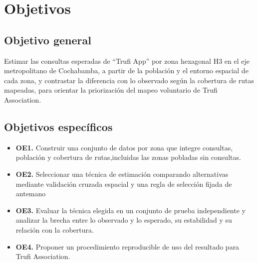 \chapter{Objetivos}
\label{cap:objetivos}

\section{Objetivo general}
\label{sec:objetivo-general}

Estimar las consultas esperadas de ``Trufi App'' por zona hexagonal H3 en el eje metropolitano de Cochabamba,
a partir de la población y el entorno espacial de cada zona, y contrastar la diferencia con lo observado
según la cobertura de rutas mapeadas, para orientar la priorización del mapeo voluntario de Trufi Association.

\section{Objetivos específicos}
\label{sec:objetivos-especificos}

\begin{itemize}
    \item \textbf{OE1.} Construir una conjunto de datos por zona que integre consultas, 
    población y cobertura de rutas,incluidas las zonas pobladas sin consultas.

    \item \textbf{OE2.} Seleccionar una técnica de estimación comparando alternativas 
    mediante validación cruzada espacial y una regla de selección fijada de antemano

    \item \textbf{OE3.} Evaluar la técnica elegida en un conjunto de prueba independiente 
    y analizar la brecha entre lo observado y lo esperado, su estabilidad y su relación con la cobertura.

    \item \textbf{OE4.} Proponer un procedimiento reproducible de uso del resultado para Trufi Association.
\end{itemize}
